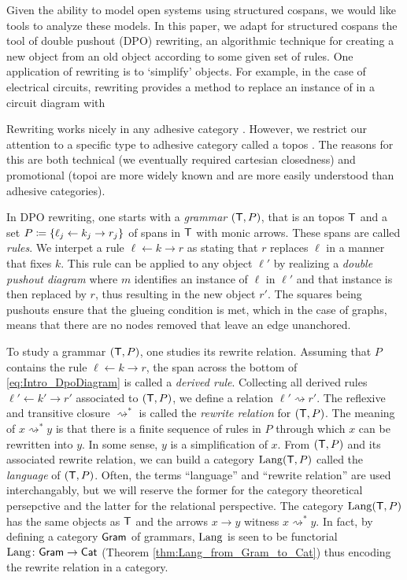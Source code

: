 \documentclass{amsart}
\begin{document}
Given the ability to model open systems using
structured cospans, we would like tools to analyze
these models. In this paper, we adapt for
structured cospans the tool of double pushout
(DPO) rewriting, an algorithmic technique for
creating a new object from an old object according
to some given set of rules. One application of
rewriting is to `simplify' objects. For example,
in the case of electrical circuits, rewriting
provides a method to replace an instance of
 in a circuit
diagram with 

Rewriting works nicely in any adhesive category
\cite{LackSobo_Adhesive}. However, we restrict our
attention to a specific type to adhesive category
called a topos \cite{LackSobo_TopsIsAdh}. The
reasons for this are both technical (we eventually
required cartesian closedness) and promotional
(topoi are more widely known and are more easily
understood than adhesive categories).

In DPO rewriting, one starts with a \emph{grammar}
$ ( \mathsf{T},P ) $, that is an topos $ \mathsf{T} $ and a set
$ P \coloneqq \{ \ell_j \leftarrow k_j \to r_j \} $ of spans in $ \mathsf{T} $ with monic arrows. These
spans are called \emph{rules}. We interpet a rule
$ \ell \gets k \to r $ as stating that $ r $
replaces $ \ell $ in a manner that fixes $ k
$. This rule can be applied to any object
$ \ell' $ by realizing a \emph{double pushout
  diagram} 
where $ m $ identifies an instance of $ \ell $ in
$ \ell' $ and that instance is then replaced by
$ r $, thus resulting in the new object $ r'
$. The squares being pushouts ensure that the
glueing condition is met, which in the case of
graphs, means that there are no nodes removed
that leave an edge unanchored.

To study a grammar $ ( \mathsf{T} , P ) $, one studies its
rewrite relation. Assuming that $ P $ contains the
rule $ \ell \gets k \to r $, the span across the
bottom of \eqref{eq:Intro_DpoDiagram} is called a
\emph{derived rule}. Collecting all derived rules
$ \ell' \gets k' \to r' $ associated to
$ ( \mathsf{T},P ) $, we define a relation
$ \ell' \rightsquigarrow r' $.  The reflexive and
transitive closure $ \rightsquigarrow^\ast $ is called
the \emph{rewrite relation} for $ ( \mathsf{T},P ) $.  The
meaning of $ x \rightsquigarrow^\ast y $ is that
there is a finite sequence of rules in $ P $ through
which $ x $ can be rewritten into $ y $.  In some
sense, $ y $ is a simplification of $ x $. From
$ ( \mathsf{T},P ) $ and its associated rewrite relation,
we can build a category $ \mathrm{Lang} ( \mathsf{T},P ) $ called
the \emph{language} of $ (\mathsf{T},P) $. Often, the
terms ``language'' and ``rewrite relation'' are
used interchangably, but we will reserve the
former for the category theoretical persepctive
and the latter for the relational perspective.
The category $ \mathrm{Lang} (\mathsf{T},P) $ has the same objects
as $ \mathsf{T} $ and the arrows $ x \to y $ witness
$ x \rightsquigarrow^\ast y $. In fact, by
defining a category $ \mathsf{Gram} $ of grammars,
$ \mathrm{Lang} $ is seen to be functorial
$ \mathrm{Lang} \colon \mathsf{Gram} \to \mathsf{Cat} $ (Theorem
\ref{thm:Lang_from_Gram_to_Cat}) thus encoding the
rewrite relation in a category.
\end{document}
